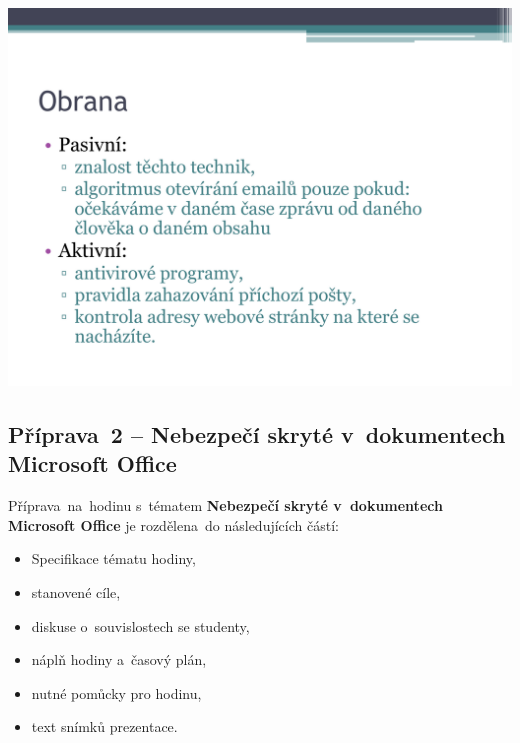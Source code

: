 \documentclass[a4paper, 12pt]{article}
\begin{document}
\vspace{0.5in}
\includegraphics[scale=0.5]{IdentityTheftSlides/p06.pdf} \\


\subsection{Příprava~2 -- Nebezpečí skryté v~dokumentech Microsoft Office}
Příprava~na~hodinu s~tématem \textbf{Nebezpečí skryté v~dokumentech Microsoft Office} je rozdělena~do následujících částí:
    \begin{itemize}
        \setlength{\itemsep}{-3pt}
        \item Specifikace tématu hodiny,
        \item stanovené cíle,
        \item diskuse o~souvislostech se studenty,
        \item náplň hodiny a~časový plán,
        \item nutné pomůcky pro hodinu,
        \item text snímků prezentace.
    \end{itemize}
\end{document}
